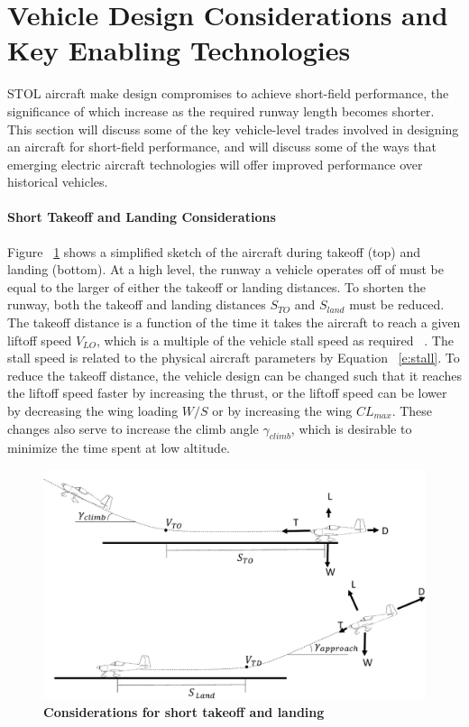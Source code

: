 \documentclass[]{aiaa-tc}%
\begin{document}
\section{Vehicle Design Considerations and Key Enabling Technologies}
STOL aircraft make design compromises to achieve short-field performance, the significance of which increase as the required runway length becomes shorter.  This section will discuss some of the key vehicle-level trades involved in designing an aircraft for short-field performance, and will discuss some of the ways that emerging electric aircraft technologies will offer improved performance over historical vehicles. 

\paragraph{Short Takeoff and Landing Considerations}
Figure ~\ref{f:takeoff} shows a simplified sketch of the aircraft during takeoff (top) and landing (bottom).  At a high level, the runway a vehicle operates off of must be equal to the larger of either the takeoff or landing distances.  To shorten the runway, both the takeoff and landing distances $S_{TO}$ and $S_{land}$ must be reduced.  The takeoff distance is a function of the time it takes the aircraft to reach a given liftoff speed $V_{LO}$, which is a multiple of the vehicle stall speed as required ~\cite{ASTM3179}.  The stall speed is related to the physical aircraft parameters by Equation ~\ref{e:stall}.  To reduce the takeoff distance, the vehicle design can be changed such that it reaches the liftoff speed faster by increasing the thrust, or the liftoff speed can be lower by decreasing the wing loading $W/S$ or by increasing the wing $CL_{max}$.  These changes also serve to increase the climb angle $\gamma_{climb}$, which is desirable to minimize the time spent at low altitude. 
\begin{figure}[h!]
	\begin{center}
	\includegraphics[width=1.0\textwidth]{takeoff_fig.pdf}
    \caption{\textbf{Considerations for short takeoff and landing}}
	\label{f:takeoff}
	\end{center}
\end{figure}
\end{document}
